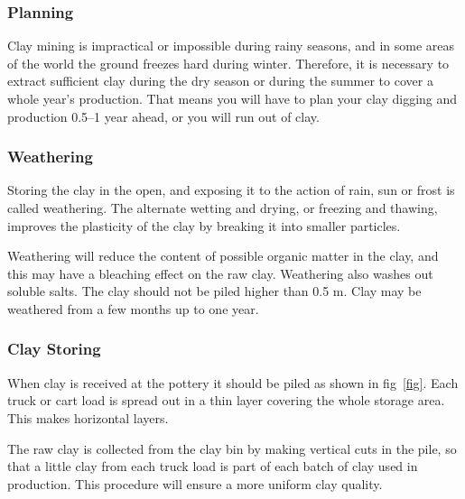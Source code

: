 \subsubsection{Planning}
Clay mining is impractical or impossible during rainy seasons, and in some 
areas of the world the ground freezes hard during winter. Therefore, it is 
necessary to extract sufficient clay during the dry season or during the summer 
to cover a whole year's production. That means you will have to plan your clay 
digging and production 0.5--1 year ahead, or you will run out of clay.
\subsubsection{Weathering}
Storing the clay in the open, and exposing it to the action of rain, sun or 
frost is called weathering. The alternate wetting and drying, or freezing and 
thawing, improves the plasticity of the clay by breaking it into smaller 
particles.

Weathering will reduce the content of possible organic matter in the clay, and 
this may have a bleaching effect on the raw clay. Weathering also washes out 
soluble salts. The clay should not be piled higher than 0.5 m. Clay may be 
weathered from a few months up to one year.
\subsubsection{Clay Storing}
When clay is received at the pottery it should be piled as shown in 
fig~\ref{fig}. Each truck or cart load is spread out in a thin layer covering 
the whole storage area. This makes horizontal layers.

The raw clay is collected from the clay bin by making vertical cuts in the 
pile, so that a little clay from each truck load is part of each batch of clay 
used in production. This procedure will ensure a more uniform clay quality.
